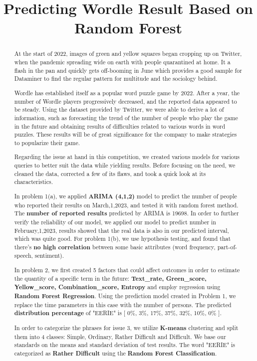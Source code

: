 \documentclass{mcmthesis}
\title{Predicting Wordle Result Based on Random Forest}
\begin{document}
\begin{abstract}
\hspace*{0.6cm} At the start of 2022, images of green and yellow squares began cropping up on Twitter, when the pandemic spreading wide on earth with people quarantined at home. It a flash in the pan and quickly gets off-booming in June which provides a good sample for Dataminer to find the regular pattern for multitude and the sociology behind.

Wordle has established itself as a popular word puzzle game by 2022. After a year, the number of Wordle players progressively decreased, and the reported data appeared to be steady. Using the dataset provided by Twitter, we were able to derive a lot of information, such as forecasting the trend of the number of people who play the game in the future and obtaining results of difficulties related to various words in word puzzles. These results will be of great significance for the company to make strategies to popularize their game.

Regarding the issue at hand in this competition, we created various models for various queries to better suit the data while yielding results. Before focusing on the need, we cleaned the data, corrected a few of its flaws, and took a quick look at its characteristics.

In problem 1(a), we applied \textbf{ARIMA (4,1,2)} model to predict the number of people who reported their results on March,1,2023, and tested it with random forest method. The \textbf{number of reported results} predicted by ARIMA is 19698. In order to further verify the reliability of our model, we applied our model to predict number in February,1,2023, results showed that the real data is also in our predicted interval, which was quite good. For problem 1(b), we use hypothesis testing, and found that there’s \textbf{no high correlation} between some basic attributes (word frequency, part-of-speech, sentiment).

In problem 2, we first created 5 factors that could affect outcomes in order to estimate the quantity of a specific term in the future: \textbf{Text\_rate, Green\_score, Yellow\_score, Combination\_score, Entropy }and employ regression using \textbf{Random Forest Regression}. Using the prediction model created in Problem 1, we replace the time parameters in this case with the number of persons. The predicted \textbf{distribution percentage} of "EERIE" is [ 0\%, 3\%, 17\%, 37\%, 32\%, 10\%, 0\% ].

In order to categorize the phrases for issue 3, we utilize \textbf{K-means} clustering and split them into 4 classes: Simple, Ordinary, Rather Difficult and Difficult. We base our standards on the means and standard deviation of test results. The word "EERIE" is categorized as \textbf{Rather Difficult} using the \textbf{Random Forest Classification}.


\end{abstract}
\end{document}
